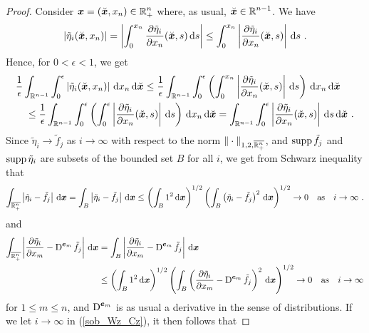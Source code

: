 \begin{proof}
Consider $\displaystyle {\bm{x}} = (\breve{{\bm{x}}}, x_n) \in \mathbb{R}^n_+$ where, as
usual, $\displaystyle \breve{{\bm{x}}} \in \mathbb{R}^{n-1}$.  We have
\[
\left| \tilde{\eta}_i(\breve{{\bm{x}}}, x_n) \right|
= \left| \int_0^{x_n} \frac{\partial{\tilde{\eta}_i}}{\partial x_n}(\breve{{\bm{x}}},s)
\,\mathrm{d}{s} \right|
\leq \int_0^{x_n} \left| \frac{\partial{\tilde{\eta}_i}}{\partial x_n}(\breve{{\bm{x}}},s)
\right| \,\mathrm{d}{s} \ .
\]
Hence, for $0< \epsilon<1$, we get
\begin{align}
& \frac{1}{\epsilon} \int_{\mathbb{R}^{n-1}} \int_0^\epsilon
\left| \tilde{\eta}_i(\breve{{\bm{x}}}, x_n) \right| \,\mathrm{d}{x_n}
\,\mathrm{d}{\breve{{\bm{x}}}}
\leq \frac{1}{\epsilon} \int_{\mathbb{R}^{n-1}} \int_0^\epsilon \left(
\int_0^{x_n} \left| \frac{\partial{\tilde{\eta}_i}}{\partial x_n}(\breve{{\bm{x}}},s)
\right| \,\mathrm{d}{s} \right) \,\mathrm{d}{x_n} \,\mathrm{d}{\breve{{\bm{x}}}} \nonumber \\
&\quad \leq \frac{1}{\epsilon} \int_{\mathbb{R}^{n-1}} \int_0^\epsilon \left(
\int_0^\epsilon \left| \frac{\partial{\tilde{\eta}_i}}{\partial x_n}(\breve{{\bm{x}}},s)
\right| \,\mathrm{d}{s}
\right) \,\mathrm{d}{x_n} \,\mathrm{d}{\breve{{\bm{x}}}} = \int_{\mathbb{R}^{n-1}} \int_0^\epsilon
\left| \frac{\partial{\tilde{\eta}_i}}{\partial x_n}(\breve{{\bm{x}}},s) \right| \,\mathrm{d}{s}
\,\mathrm{d}{\breve{{\bm{x}}}} \ .
\label{sob_Wz_Cz}
\end{align}
Since $\tilde{\eta}_i \rightarrow \tilde{f}_j$ as $i\rightarrow \infty$ with
respect to the norm $\displaystyle \|\cdot\|_{1,2,\overline{\mathbb{R}^n_+}}$,
and $\operatorname{supp} \tilde{f}_j$ and 
$\operatorname{supp} \tilde{\eta}_i$ are subsets of the bounded set $B$ for all $i$,
we get from Schwarz inequality that
\[
\int_{\overline{\RR^n_+}} \left| \tilde{\eta}_i - \tilde{f}_j\right| \dx{\VEC{x}} 
= \int_B \left| \tilde{\eta}_i - \tilde{f}_j\right| \dx{\VEC{x}}
\leq \left(\int_B 1^2 \dx{\VEC{x}}\right)^{1/2}
\left( \int_B \left( \tilde{\eta}_i - \tilde{f}_j\right)^2 \dx{\VEC{x}} 
\right)^{1/2} \rightarrow 0 \quad \text{as} \quad i\rightarrow \infty \ .
\]
and
\begin{align*}
\int_{\overline{\mathbb{R}^n_+}} \left| \frac{\partial{\tilde{\eta}_i}}{\partial x_m} -
\operatorname{D}^{{\bm{e}}_m}\tilde{f}_j\right| \,\mathrm{d}{{\bm{x}}} &=
\int_B \left| \frac{\partial{\tilde{\eta}_i}}{\partial x_m} - \operatorname{D}^{{\bm{e}}_m}\tilde{f}_j\right|
\,\mathrm{d}{{\bm{x}}} \\
&\leq \left(\int_B 1^2 \,\mathrm{d}{{\bm{x}}}\right)^{1/2}
\left( \int_B \left( \frac{\partial{\tilde{\eta}_i}}{\partial x_m} -
\operatorname{D}^{{\bm{e}}_m}\tilde{f}_j \right)^2 \,\mathrm{d}{{\bm{x}}} 
\right)^{1/2} \rightarrow 0 \quad \text{as} \quad i\rightarrow \infty
\end{align*}
for $1 \leq m \leq n$, and $\displaystyle \operatorname{D}^{{\bm{e}}_m}$ is as
usual a derivative in the sense of distributions.  If we let
$i \rightarrow \infty$ in (\ref{sob_Wz_Cz}), it then follows that

\end{proof}
